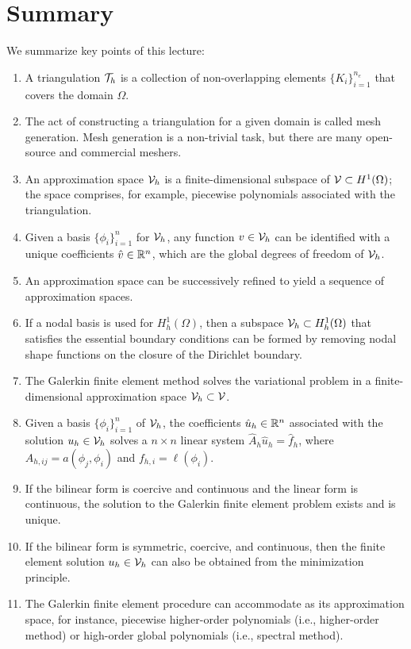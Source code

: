 \section{Summary}
We summarize key points of this lecture:
\begin{enumerate}
\item A triangulation $\mathcal{T}_h$ is a collection of non-overlapping elements $\{K_i\}_{i=1}^{n_e}$ that covers the domain $\Omega$.
\item The act of constructing a triangulation for a given domain is called mesh generation. Mesh generation is a non-trivial task, but there are many open-source and commercial meshers.
\item An approximation space $\mathcal{V}_h$ is a finite-dimensional subspace of $\mathcal{V} \subset H^1(\Omega)$; the space comprises, for example, piecewise polynomials associated with the triangulation.
\item Given a basis $\{ \phi_i \}_{i=1}^n$ for $\mathcal{V}_h$, any function $v \in \mathcal{V}_h$ can be identified with a unique coefficients $\hat v \in \mathbb{R}^n$, which are the global degrees of freedom of $\mathcal{V}_h$.
\item An approximation space can be successively refined to yield a sequence of approximation spaces.
\item If a nodal basis is used for $H^1_h(\Omega)$, then a subspace $\mathcal{V}_h \subset H^1_h(\Omega)$ that satisfies the essential boundary conditions can be formed by removing nodal shape functions on the closure of the Dirichlet boundary.
\item The Galerkin finite element method solves the variational problem in a finite-dimensional approximation space $\mathcal{V}_h \subset \mathcal{V}$.
\item Given a basis $\{\phi_i\}_{i=1}^n$ of $\mathcal{V}_h$, the coefficients $\hat u_h \in \mathbb{R}^n$ associated with the solution $u_h \in \mathcal{V}_h$ solves a $n \times n$ linear system $\hat A_h \hat u_h = \hat f_h$, where $A_{h,ij} = a(\phi_j,\phi_i)$ and $f_{h,i} = \ell(\phi_i)$.
\item If the bilinear form is coercive and continuous and the linear form is continuous, the solution to the Galerkin finite element problem exists and is unique.
\item If the bilinear form is symmetric, coercive, and continuous, then the finite element solution $u_h \in \mathcal{V}_h$ can also be obtained from the minimization principle.
\item The Galerkin finite element procedure can accommodate as its approximation space, for instance, piecewise higher-order polynomials (i.e., higher-order method) or high-order global polynomials (i.e., spectral method).
\end{enumerate}
